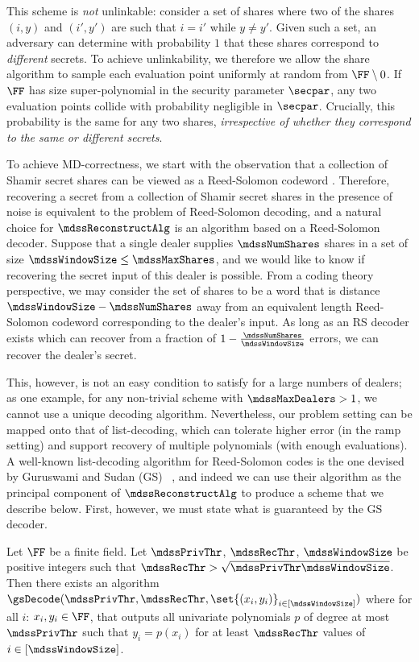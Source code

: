 This scheme is {\em not} unlinkable: consider a set of shares where two of the shares $(i,y)$ and $(i',y')$ are such that $i=i'$ while  $y\neq y'$.
Given such a set, an adversary can determine with probability $1$ that these shares correspond to {\em different} secrets.
To achieve unlinkability, we therefore we allow the share algorithm to sample each evaluation point uniformly at random from $\FF \setminus 0$.
If $\FF$ has size super-polynomial in the security parameter $\secpar$, any two evaluation points collide with probability negligible in $\secpar$.
Crucially, this probability is the same for any two shares, {\em irrespective of whether they correspond to the same or different secrets}.

To achieve MD-correctness, we start with the observation that a collection of Shamir secret shares can be viewed as a Reed-Solomon codeword \cite{localReeSol60, localMcEliece81}.
Therefore, recovering a secret from a collection of Shamir secret shares in the presence of noise is equivalent to the problem of Reed-Solomon decoding, and a natural choice for $\mdssReconstructAlg$ is an algorithm based on a Reed-Solomon decoder.
Suppose that a single dealer supplies $\mdssNumShares$ shares in a set of size $\mdssWindowSize \leq \mdssMaxShares$, and we would like to know if recovering the secret input of this dealer is possible.
From a coding theory perspective, we may consider the set of shares to be a word that is distance $\mdssWindowSize-\mdssNumShares$ away from an equivalent length Reed-Solomon codeword corresponding to the dealer's input.
As long as an RS decoder exists which can recover from a fraction of $1 - \frac{\mdssNumShares}{\mdssWindowSize}$ errors, we can recover the dealer's secret.

This, however, is not an easy condition to satisfy for a large numbers of dealers; as one example, for any non-trivial scheme with $\mdssMaxDealers > 1$, we cannot use a unique decoding algorithm.
Nevertheless, our problem setting can be mapped onto that of list-decoding, which can tolerate higher error (in the ramp setting) and support recovery of multiple polynomials (with enough evaluations).
A well-known list-decoding algorithm for Reed-Solomon codes is the one devised by Guruswami and Sudan (GS) ~\cite{FOCS:GurSud98}, and indeed we can use their algorithm as the principal component of $\mdssReconstructAlg$ to produce a scheme that we describe below.
First, however, we must state what is guaranteed by the GS decoder.

\begin{theorem}
	Let $\FF$ be a finite field.
	Let $\mdssPrivThr$, $\mdssRecThr$, $\mdssWindowSize$ be positive integers such that $\mdssRecThr > \sqrt{\mdssPrivThr\mdssWindowSize}$.
	Then there exists an algorithm $\gsDecode(\mdssPrivThr, \mdssRecThr, \set{(x_i, y_i)}_{i\in[\mdssWindowSize]})$ where for all $i$: $x_i, y_i \in \FF$, that outputs all univariate polynomials $p$ of degree at most $\mdssPrivThr$ such that $y_i = p(x_i)$ for at least $\mdssRecThr$ values of $i \in [\mdssWindowSize]$.
\end{theorem}

